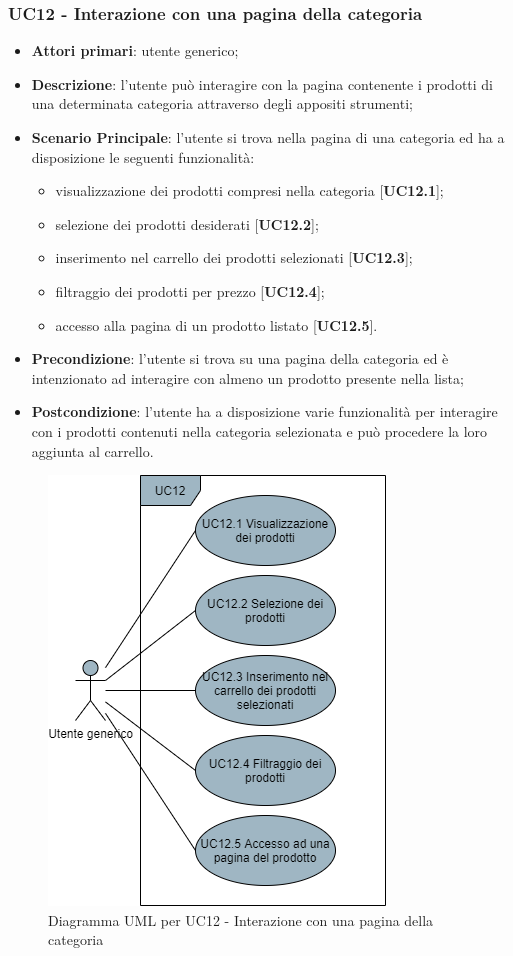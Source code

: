 \subsubsection{UC12 - Interazione con una pagina della categoria}
\begin{itemize}
\item \textbf{Attori primari}: utente generico;
\item \textbf{Descrizione}: l'utente può interagire con la pagina contenente i prodotti di una determinata categoria attraverso degli appositi strumenti;
\item \textbf{Scenario Principale}: l'utente si trova nella pagina di una categoria ed ha a disposizione le seguenti funzionalità:
\begin{itemize}
\item visualizzazione dei prodotti compresi nella categoria [\textbf{UC12.1}];
\item selezione dei prodotti desiderati [\textbf{UC12.2}];
\item inserimento nel carrello dei prodotti selezionati [\textbf{UC12.3}];
\item filtraggio dei prodotti per prezzo [\textbf{UC12.4}];
\item accesso alla pagina di un prodotto listato [\textbf{UC12.5}].
\end{itemize}
\item \textbf{Precondizione}: l'utente si trova su una pagina della categoria ed è intenzionato ad interagire con almeno un prodotto presente nella lista;
\item \textbf{Postcondizione}: l'utente ha a disposizione varie funzionalità per interagire con i prodotti contenuti nella categoria selezionata e può procedere la loro aggiunta al carrello.
\end{itemize}
\begin{figure}[H]
\centering
\includegraphics[scale=0.6]{res/UseCase/Immagini/InterazionePaginaCategoria}
\caption{Diagramma UML per UC12 - Interazione con una pagina della categoria}
\end{figure}

